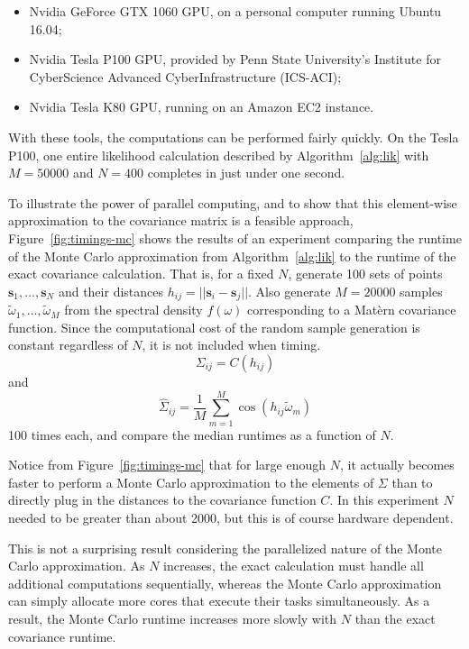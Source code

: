 \begin{itemize}
	\item Nvidia GeForce GTX 1060 GPU, on a personal computer running Ubuntu 16.04;
	\item Nvidia Tesla P100 GPU, provided by Penn State University's Institute for CyberScience Advanced CyberInfrastructure (ICS-ACI);
	\item Nvidia Tesla K80 GPU, running on an Amazon EC2 instance.
\end{itemize}

With these tools, the computations can be performed fairly quickly. On the Tesla P100, one entire likelihood calculation described by Algorithm~\ref{alg:lik} with $M = 50000$ and $N = 400$ completes in just under one second.

To illustrate the power of parallel computing, and to show that this element-wise approximation to the covariance matrix is a feasible approach, Figure~\ref{fig:timings-mc} shows the results of an experiment comparing the runtime of the Monte Carlo approximation from Algorithm~\ref{alg:lik} to the runtime of the exact covariance calculation. That is, for a fixed $N$, generate 100 sets of points $\bm{s}_1, \dots, \bm{s}_N$ and their distances $h_{ij} = ||\bm{s}_i - \bm{s}_j||$. Also generate $M = 20000$ samples $\widetilde{\omega}_1, \dots, \widetilde{\omega}_M$ from the spectral density $f(\omega)$ corresponding to a Mat\`ern covariance function. Since the computational cost of the random sample generation is constant regardless of $N$, it is not included when timing.
\[
	\Sigma_{ij} = C(h_{ij})
\]
and
\[
	\widehat{\Sigma}_{ij} = \frac{1}{M}\sum_{m=1}^M \cos(h_{ij} \widetilde{\omega}_{m})
\]
100 times each, and compare the median runtimes as a function of $N$.

Notice from Figure~\ref{fig:timings-mc} that for large enough $N$, it actually becomes faster to perform a Monte Carlo approximation to the elements of $\Sigma$ than to directly plug in the distances to the covariance function $C$. In this experiment $N$ needed to be greater than about 2000, but this is of course hardware dependent.

This is not a surprising result considering the parallelized nature of the Monte Carlo approximation. As $N$ increases, the exact calculation must handle all additional computations sequentially, whereas the Monte Carlo approximation can simply allocate more cores that execute their tasks simultaneously. As a result, the Monte Carlo runtime increases more slowly with $N$ than the exact covariance runtime.

